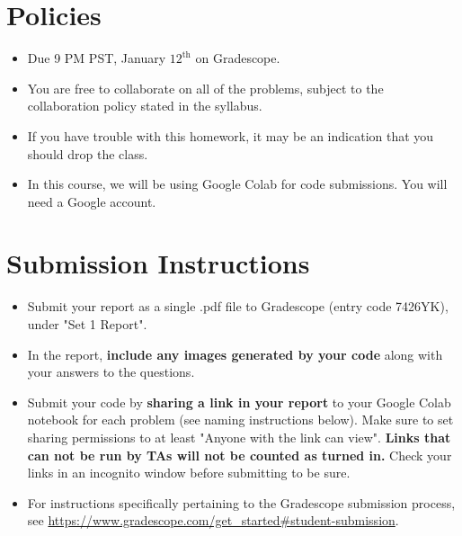 \newif\ifshowsolutions
\showsolutionstrue





\pagestyle{fancy}




\section*{Policies}
\begin{itemize}
	\item Due 9 PM PST, January $12^\text{th}$ on Gradescope. 
	\item You are free to collaborate on all of the problems, subject to the collaboration policy stated in the syllabus.
	\item If you have trouble with this homework, it may be an indication that you should drop the class.
	\item In this course, we will be using Google Colab for code submissions. You will need a Google account.
\end{itemize}

\section*{Submission Instructions}

\begin{itemize}
	\item Submit your report as a single .pdf file to Gradescope (entry code 7426YK), under "Set 1 Report". 
	\item In the report, \textbf{include any images generated by your code} along with your answers to the questions.
	\item Submit your code by \textbf{sharing a link in your report} to your Google Colab notebook for each problem (see naming instructions below). Make sure to set sharing permissions to at least "Anyone with the link can view". \textbf{Links that can not be run by TAs will not be counted as turned in.} Check your links in an incognito window before submitting to be sure. 
	\item For instructions specifically pertaining to the Gradescope submission process, see \url{https://www.gradescope.com/get_started#student-submission}.
	
\end{itemize}


